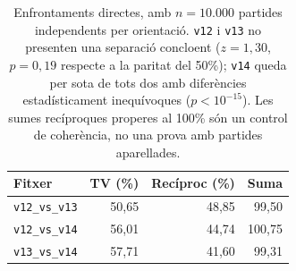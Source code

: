 \begin{table}[htbp]
\centering
\caption{Enfrontaments directes, amb $n=10.000$ partides independents per orientació. \texttt{v12} i \texttt{v13} no presenten una separació concloent ($z=1{,}30$, $p=0{,}19$ respecte a la paritat del 50\%); \texttt{v14} queda per sota de tots dos amb diferències estadísticament inequívoques ($p < 10^{-15}$). Les sumes recíproques properes al 100\% són un control de coherència, no una prova amb partides aparellades.}
\label{tab:heur_h2h}
\small
\begin{tabular}{lrrr}
\toprule
\textbf{Fitxer} & \textbf{TV (\%)} & \textbf{Recíproc (\%)} & \textbf{Suma} \\
\midrule
\texttt{v12\_vs\_v13} & 50,65 & 48,85 & 99,50 \\
\texttt{v12\_vs\_v14} & 56,01 & 44,74 & 100,75 \\
\texttt{v13\_vs\_v14} & 57,71 & 41,60 & 99,31 \\
\bottomrule
\end{tabular}
\end{table}
